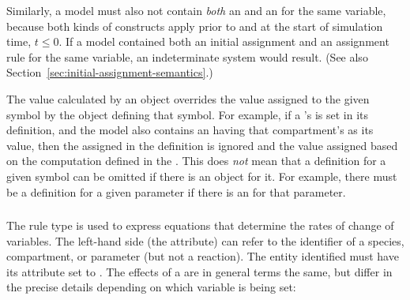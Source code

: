 Similarly, a model must also not contain \emph{both} an
\AssignmentRule and an \InitialAssignment for the same variable,
because both kinds of constructs apply prior to and at the start
of simulation time, \ie $t \leq 0$.  If a model contained both an
initial assignment and an assignment rule for the same variable,
an indeterminate system would result.  (See also
Section~\ref{sec:initial-assignment-semantics}.)

The value calculated by an \AssignmentRule object overrides the
value assigned to the given symbol by the object defining that
symbol.  For example, if a \Compartment's  is set in
its definition, and the model also contains an \AssignmentRule
having that compartment's  as its 
value, then the  assigned in the \Compartment
definition is ignored and the value assigned based on the
computation defined in the \AssignmentRule.  This does \emph{not}
mean that a definition for a given symbol can be omitted if there
is an \AssignmentRule object for it.  For example, there must be a
\Parameter definition for a given parameter if there is an
\AssignmentRule for that parameter.


\subsubsection{}
\label{sec:raterule}

The rule type \RateRule is used to express equations that
determine the rates of change of variables.  The left-hand side
(the  attribute) can refer to the identifier of a
species, compartment, or parameter (but not a reaction).  The
entity identified must have its  attribute set to
.  The effects of a \RateRule are in general terms the
same, but differ in the precise details depending on which
variable is being set:

